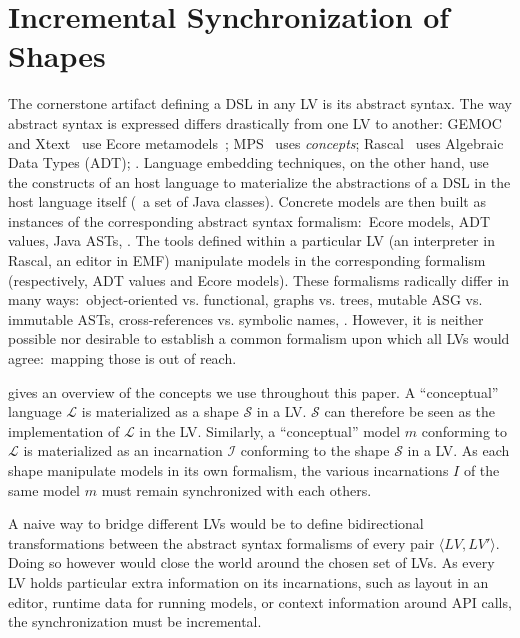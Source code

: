 \section{Incremental Synchronization of Shapes}
\label{sec:prism}

The cornerstone artifact defining a DSL in any LV is its abstract syntax.
The way abstract syntax is expressed differs drastically from one LV to another: GEMOC~\cite{bousse2016execution} and Xtext~\cite{bettini2016implementing} use Ecore metamodels~\cite{steinberg2008emf}; MPS~\cite{voelter2014generic} uses \emph{concepts}; Rascal~\cite{klint2010easy} uses Algebraic Data Types (ADT); \etc.
Language embedding techniques, on the other hand, use the constructs of an host language to materialize the abstractions of a DSL in the host language itself (\eg~a set of Java classes).
Concrete models are then built as instances of the corresponding abstract syntax formalism:~Ecore models, ADT values, Java ASTs, \etc.
The tools defined within a particular LV (an interpreter in Rascal, an editor in EMF) manipulate models in the corresponding formalism (respectively, ADT values and Ecore models).
These formalisms radically differ in many ways:~object-oriented vs. functional, graphs vs. trees, mutable ASG vs. immutable ASTs, cross-references vs. symbolic names, \etc.
However, it is neither possible nor desirable to establish a common formalism upon which all LVs would agree:~mapping those is out of reach.

 gives an overview of the concepts we use throughout this paper.
A ``conceptual'' language $\mathcal{L}$ is materialized as a shape $\mathcal{S}$ in a LV.
$\mathcal{S}$ can therefore be seen as the implementation of $\mathcal{L}$ in the LV.
Similarly, a ``conceptual'' model $m$ conforming to $\mathcal{L}$ is materialized as an incarnation $\mathcal{I}$ conforming to the shape $\mathcal{S}$ in a LV.
As each shape manipulate models in its own formalism, the various incarnations $I$ of the same model $m$ must remain synchronized with each others.

A naive way to bridge different LVs would be to define bidirectional transformations between the abstract syntax formalisms of every pair $\langle LV, LV' \rangle$.
Doing so however would close the world around the chosen set of LVs.
As every LV holds particular extra information on its incarnations, such as layout in an editor, runtime data for running models, or context information around API calls, the synchronization must be incremental.

